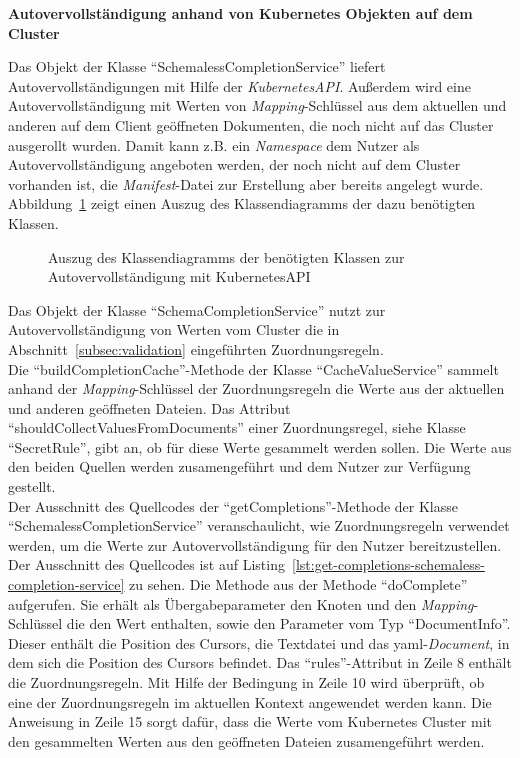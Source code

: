 \textbf{Autovervollständigung anhand von Kubernetes Objekten auf dem Cluster}

Das Objekt der Klasse ``SchemalessCompletionService'' liefert Autovervollständigungen mit Hilfe der \textit{KubernetesAPI}.
Außerdem wird eine Autovervollständigung
mit Werten von \textit{Mapping}-Schlüssel aus dem aktuellen und anderen auf dem Client geöffneten Dokumenten,
die noch nicht auf das Cluster ausgerollt wurden.
Damit kann z.B. ein \textit{Namespace} dem Nutzer als Autovervollständigung angeboten werden, der noch nicht auf dem Cluster vorhanden ist,
die \textit{Manifest}-Datei zur Erstellung aber bereits angelegt wurde.
Abbildung~\ref{fig:class-diagram-yaml-language-service-schemaless-completion} zeigt einen Auszug des Klassendiagramms der dazu benötigten Klassen.

\begin{figure}[htp] %
  \centering
  \caption{Auszug des Klassendiagramms der benötigten Klassen zur Autovervollständigung mit KubernetesAPI}
  \label{fig:class-diagram-yaml-language-service-schemaless-completion}
\end{figure}

Das Objekt der Klasse ``SchemaCompletionService'' nutzt zur Autovervollständigung von Werten vom Cluster die
in Abschnitt~\ref{subsec:validation} eingeführten Zuordnungsregeln.
\\
Die ``buildCompletionCache''-Methode der Klasse ``CacheValueService'' sammelt anhand der \textit{Mapping}-Schlüssel
der Zuordnungsregeln die Werte aus der aktuellen und anderen geöffneten Dateien.
Das Attribut ``shouldCollectValuesFromDocuments'' einer Zuordnungsregel, siehe Klasse ``SecretRule'', gibt an,
ob für diese Werte gesammelt werden sollen.
Die Werte aus den beiden Quellen werden zusamengeführt und dem Nutzer zur Verfügung gestellt.
\\
Der Ausschnitt des Quellcodes der ``getCompletions''-Methode der Klasse ``SchemalessCompletionService'' veranschaulicht,
wie Zuordnungsregeln verwendet werden, um die Werte zur Autovervollständigung für den Nutzer bereitzustellen.
Der Ausschnitt des Quellcodes ist auf Listing~\ref{lst:get-completions-schemaless-completion-service} zu sehen. Die Methode aus der Methode ``doComplete'' aufgerufen.
Sie erhält als Übergabeparameter den Knoten und den \textit{Mapping}-Schlüssel die den Wert enthalten, sowie den Parameter vom Typ
``DocumentInfo''. Dieser enthält die Position des Cursors, die Textdatei und das \ac{yaml}-\textit{Document}, in dem sich die
Position des Cursors befindet. Das ``rules''-Attribut in Zeile 8 enthält die Zuordnungsregeln.
Mit Hilfe der Bedingung in Zeile 10 wird überprüft, ob eine der Zuordnungsregeln im aktuellen Kontext angewendet werden kann.
Die Anweisung in Zeile 15 sorgt dafür, dass die Werte vom Kubernetes Cluster mit den gesammelten Werten
aus den geöffneten Dateien zusamengeführt werden.


